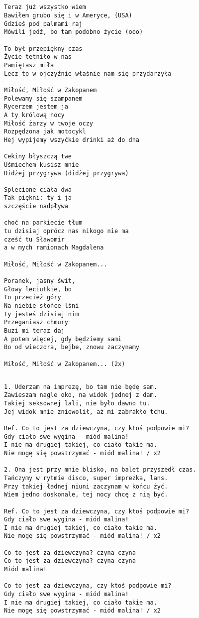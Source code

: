 \documentclass[12pt]{article}
\begin{document}
\subsection*{}
\begin{verbatim}
Teraz już wszystko wiem
Bawiłem grubo się i w Ameryce, (USA)
Gdzieś pod palmami raj
Mówili jedź, bo tam podobno życie (ooo)

To był przepiękny czas
Życie tętniło w nas
Pamiętasz miła
Lecz to w ojczyźnie właśnie nam się przydarzyła

Miłość, Miłość w Zakopanem
Polewamy się szampanem
Rycerzem jestem ja
A ty królową nocy
Miłość żarzy w twoje oczy
Rozpędzona jak motocykl
Hej wypijemy wszyćkie drinki aż do dna

Cekiny błyszczą twe
Uśmiechem kusisz mnie
Didżej przygrywa (didżej przygrywa)

Splecione ciała dwa
Tak piękni: ty i ja
szczęście nadpływa

choć na parkiecie tłum
tu dzisiaj oprócz nas nikogo nie ma
cześć tu Sławomir
a w mych ramionach Magdalena

Miłość, Miłość w Zakopanem...

Poranek, jasny świt,
Głowy leciutkie, bo
To przecież góry
Na niebie słońce lśni
Ty jesteś dzisiaj nim
Przeganiasz chmury
Buzi mi teraz daj
A potem więcej, gdy będziemy sami
Bo od wieczora, bejbe, znowu zaczynamy

Miłość, Miłość w Zakopanem... (2x)
\end{verbatim}
\clearpage


\subsection*{}
\begin{verbatim}
1. Uderzam na imprezę, bo tam nie będę sam.
Zawieszam nagle oko, na widok jednej z dam.
Takiej seksownej lali, nie było dawno tu.
Jej widok mnie zniewolił, aż mi zabrakło tchu.

Ref. Co to jest za dziewczyna, czy ktoś podpowie mi?
Gdy ciało swe wygina - miód malina!
I nie ma drugiej takiej, co ciało takie ma.
Nie mogę się powstrzymać - miód malina! / x2

2. Ona jest przy mnie blisko, na balet przyszedł czas.
Tańczymy w rytmie disco, super imprezka, lans.
Przy takiej ładnej niuni zaczynam w końcu żyć.
Wiem jedno doskonale, tej nocy chcę z nią być.

Ref. Co to jest za dziewczyna, czy ktoś podpowie mi?
Gdy ciało swe wygina - miód malina!
I nie ma drugiej takiej, co ciało takie ma.
Nie mogę się powstrzymać - miód malina! / x2

Co to jest za dziewczyna? czyna czyna
Co to jest za dziewczyna? czyna czyna
Miód malina!

Co to jest za dziewczyna, czy ktoś podpowie mi?
Gdy ciało swe wygina - miód malina!
I nie ma drugiej takiej, co ciało takie ma.
Nie mogę się powstrzymać - miód malina! / x2
\end{verbatim}
\clearpage
\end{document}
